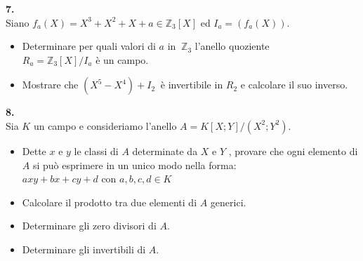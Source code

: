 \documentclass[italian,a4paper,11pt]
{article}
\newcommand{\Z}{\mathbb Z}
\newcommand{\acc}{\`}
\begin{document}
\vspace{0.4 cm}
\noindent
\begin{Ex}\textbf{ 7.}\\
Siano $f_a(X) = X^3 + X^2 + X + a \in  \Z_3[X]$ ed $I_a = (f_a(X))$.
\begin{itemize}
\item Determinare per quali valori di $a $ in $\ \Z_3$ l'anello quoziente\\ 
$R_a = \Z_3[X]/I_a$ \acc e un campo.
\item Mostrare che $(X^5 - X^4) + I_2 \ $ \acc e invertibile in $R_2$ e calcolare il suo
inverso.
\end{itemize}
\end{Ex}

\vspace{0.4 cm}
\noindent
\begin{Ex}\textbf{ 8.}\\
Sia $K$ un campo e consideriamo l'anello $A = K[X;Y]/(X^2;Y^2)$.
\begin{itemize}
\item Dette $x$ e $y$ le classi di $A$ determinate da $X$ e $Y$ , provare che ogni
elemento di $A$ si pu\acc o esprimere in un unico modo nella forma:\\ $axy + bx + cy + d$ con $a, b, c, d \in K$
\item Calcolare il prodotto tra due elementi di $A$ generici.
\item Determinare gli zero divisori di $A$.
\item Determinare gli invertibili di $A$.
\end{itemize}
\end{Ex}
\end{document}
